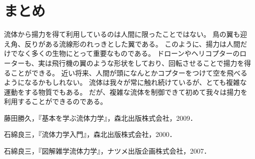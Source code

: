 \documentclass[10pt,b5paper,papersize,dvipdfmx]{jsbook}
\begin{document}
\section{まとめ}
流体から揚力を得て利用しているのは人間に限ったことではない。
鳥の翼も迎え角、反りがある流線形のれっきとした翼である。
このように、揚力は人間だけでなく多くの生物にとって重要なものである。
ドローンやヘリコプターのローターも、実は飛行機の翼のような形状をしており、回転させることで揚力を得ることができる。
近い将来、人間が頭になんとかコプターをつけて空を飛べるようになるかもしれない。
流体は我々が常に触れ続けているが、とても複雑な運動をする物質でもある。
だが、複雑な流体を制御できて初めて我々は揚力を利用することができるのである。

\begin{thebibliography}{99}
  \item 藤田勝久，『基本を学ぶ流体力学』，森北出版株式会社，2009．
  \item 石綿良三，『流体力学入門』，森北出版株式会社，2000．
  \item 石綿良三，『図解雑学流体力学』，ナツメ出版企画株式会社，2007．
\end{thebibliography}
\end{document}
